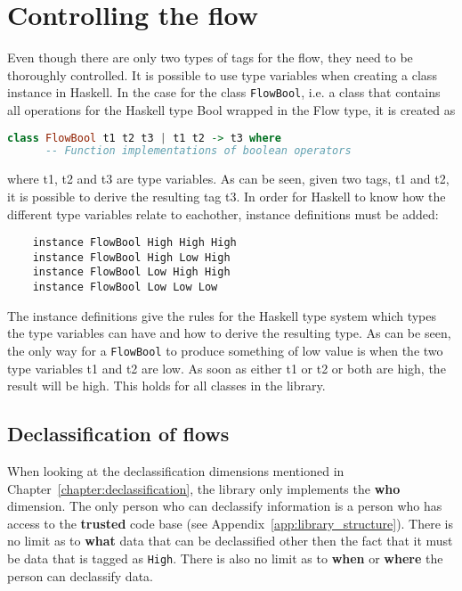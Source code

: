 \section{Controlling the flow}
Even though there are only two types of tags for the flow, they need to be thoroughly controlled. It is possible to use type variables when creating a class instance in Haskell. In the case for the class {\tt FlowBool}, i.e. a class that contains all operations for the Haskell type Bool wrapped in the Flow type, it is created as
\begin{center}
  \begin{lstlisting}[language=Haskell]
    class FlowBool t1 t2 t3 | t1 t2 -> t3 where
      -- Function implementations of boolean operators
  \end{lstlisting}
\end{center}
where t1, t2 and t3 are type variables. As can be seen, given two tags, t1 and t2, it is possible to derive the resulting tag t3. In order for Haskell to know how the different type variables relate to eachother, instance definitions must be added:
\begin{verbatim}
    instance FlowBool High High High
    instance FlowBool High Low High
    instance FlowBool Low High High
    instance FlowBool Low Low Low
\end{verbatim}
The instance definitions give the rules for the Haskell type system which types the type variables can have and how to derive the resulting type. As can be seen, the only way for a {\tt FlowBool} to produce something of low value is when the two type variables t1 and t2 are low. As soon as either t1 or t2 or both are high, the result will be high. This holds for all classes in the library.

\subsection{Declassification of flows}
When looking at the declassification dimensions mentioned in Chapter~\ref{chapter:declassification}, the library only implements the \textbf{who} dimension. The only person who can declassify information is a person who has access to the \textbf{trusted} code base (see Appendix~\ref{app:library_structure}). There is no limit as to \textbf{what} data that can be declassified other then the fact that it must be data that is tagged as {\tt High}. There is also no limit as to \textbf{when} or \textbf{where} the person can declassify data.

